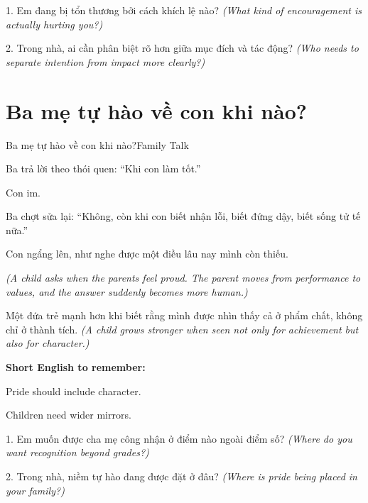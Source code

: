 \begin{tuhocnhanh}
1. Em đang bị tổn thương bởi cách khích lệ nào? \textit{(What kind of encouragement is actually hurting you?)}

2. Trong nhà, ai cần phân biệt rõ hơn giữa mục đích và tác động? \textit{(Who needs to separate intention from impact more clearly?)}
\end{tuhocnhanh}
\ngancach

\section{Ba mẹ tự hào về con khi nào?}
\begin{truyen}{Ba mẹ tự hào về con khi nào?}{Family Talk}

Ba trả lời theo thói quen: ``Khi con làm tốt.''

Con im.

Ba chợt sửa lại: ``Không, còn khi con biết nhận lỗi, biết đứng dậy, biết sống tử tế nữa.''

Con ngẩng lên, như nghe được một điều lâu nay mình còn thiếu.

\textit{(A child asks when the parents feel proud. The parent moves from performance to values, and the answer suddenly becomes more human.)}
\end{truyen}

\begin{baihoc}
Một đứa trẻ mạnh hơn khi biết rằng mình được nhìn thấy cả ở phẩm chất, không chỉ ở thành tích.
\textit{(A child grows stronger when seen not only for achievement but also for character.)}
\end{baihoc}

\begin{ghinhoanh}
\textbf{Short English to remember:}

Pride should include character.

Children need wider mirrors.
\end{ghinhoanh}

\begin{tuhocnhanh}
1. Em muốn được cha mẹ công nhận ở điểm nào ngoài điểm số? \textit{(Where do you want recognition beyond grades?)}

2. Trong nhà, niềm tự hào đang được đặt ở đâu? \textit{(Where is pride being placed in your family?)}
\end{tuhocnhanh}
\ngancach

